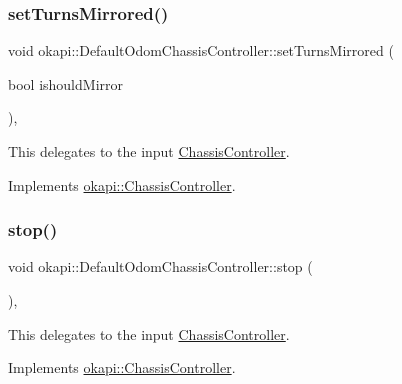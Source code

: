 \mbox{\label{classokapi_1_1DefaultOdomChassisController_aed92ba0b7a9fc15bf645f3789e8598ae}} 
\subsubsection{\texorpdfstring{setTurnsMirrored()}{setTurnsMirrored()}}
{\footnotesize\ttfamily void okapi\+::\+Default\+Odom\+Chassis\+Controller\+::set\+Turns\+Mirrored (\begin{DoxyParamCaption}\item[{bool}]{ishould\+Mirror }\end{DoxyParamCaption})\hspace{0.3cm}{\ttfamily [override]}, {\ttfamily [virtual]}}

This delegates to the input \mbox{\hyperlink{classokapi_1_1ChassisController}{Chassis\+Controller}}. 

Implements \mbox{\hyperlink{classokapi_1_1ChassisController_a37ae36ec8936272eb31e3baed7eed417}{okapi\+::\+Chassis\+Controller}}.

\mbox{\label{classokapi_1_1DefaultOdomChassisController_af6a98415e2c4e17dfec77e215efb1a41}} 
\subsubsection{\texorpdfstring{stop()}{stop()}}
{\footnotesize\ttfamily void okapi\+::\+Default\+Odom\+Chassis\+Controller\+::stop (\begin{DoxyParamCaption}{ }\end{DoxyParamCaption})\hspace{0.3cm}{\ttfamily [override]}, {\ttfamily [virtual]}}

This delegates to the input \mbox{\hyperlink{classokapi_1_1ChassisController}{Chassis\+Controller}}. 

Implements \mbox{\hyperlink{classokapi_1_1ChassisController_ac67edbbbe1c8480c4503b9875a3719cd}{okapi\+::\+Chassis\+Controller}}.


